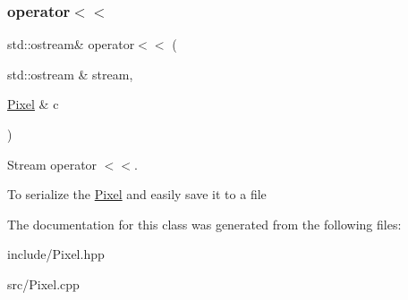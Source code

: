 \subsubsection{\texorpdfstring{operator$<$$<$}{operator<<}}
{\footnotesize\ttfamily std\+::ostream\& operator$<$$<$ (\begin{DoxyParamCaption}\item[{std\+::ostream \&}]{stream,  }\item[{\hyperlink{classPixel}{Pixel} \&}]{c }\end{DoxyParamCaption})\hspace{0.3cm}{\ttfamily [friend]}}



Stream operator $<$$<$. 

To serialize the \hyperlink{classPixel}{Pixel} and easily save it to a file 

The documentation for this class was generated from the following files\+:\begin{DoxyCompactItemize}
\item 
include/Pixel.\+hpp\item 
src/Pixel.\+cpp\end{DoxyCompactItemize}
